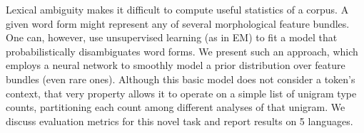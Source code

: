 Lexical ambiguity makes it difficult to compute useful statistics of a corpus. A given word form might represent any of several morphological feature bundles. One can, however, use unsupervised learning (as in EM) to fit a model that probabilistically disambiguates word forms. We present such an approach, which employs a neural network to smoothly model a prior distribution over feature bundles (even rare ones). Although this basic model does not consider a token's context, that very property allows it to operate on a simple list of unigram type counts, partitioning each count among different analyses of that unigram. We discuss evaluation metrics for this novel task and report results on 5 languages.
